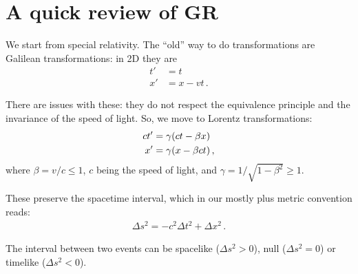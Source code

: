 \documentclass[main.tex]{subfiles}
\begin{document}


\section{A quick review of GR}

We start from special relativity. 
The ``old'' way to do transformations are Galilean transformations: in 2D they are
%
\begin{subequations}
\begin{align}
t' &= t  \\
x' &= x - vt
\,.
\end{align}
\end{subequations}

There are issues with these: they do not respect the equivalence principle and the invariance of the speed of light.
So, we move to Lorentz transformations: 
%
\begin{subequations}
\begin{align}
ct' &= \gamma \qty(ct - \beta x)  \\
x' &= \gamma \qty(x - \beta ct)
\,,
\end{align}
\end{subequations}
%
where \(\beta = v/c \leq 1\), \(c\) being the speed of light, and \(\gamma = 1/\sqrt{1 - \beta^2} \geq 1\). 

These preserve the spacetime interval, which in our mostly plus metric convention reads:
%
\begin{align}
\Delta s^2 = - c^2 \Delta t^2 + \Delta x^2
\,.
\end{align}

The interval between two events can be spacelike (\(\Delta s^2 > 0\)), null (\(\Delta s^2 = 0\)) or timelike (\(\Delta s^2 < 0\)). 
\end{document}
